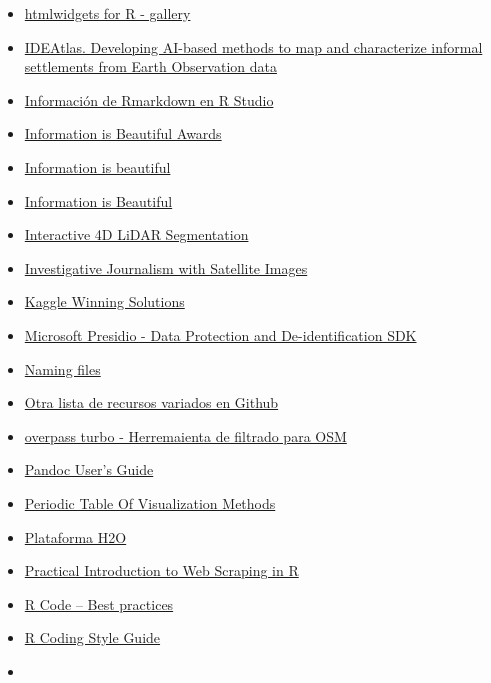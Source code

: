 \documentclass[
]{article}
\begin{document}
\begin{itemize}
\item
  \href{http://gallery.htmlwidgets.org/}{htmlwidgets for R - gallery}
\item
  \href{https://ideatlas.eu/}{IDEAtlas. Developing AI-based methods to
  map and characterize informal settlements from Earth Observation data}
\item
  \href{http://rmarkdown.rstudio.com/}{Información de Rmarkdown en R
  Studio}
\item
  \href{https://www.informationisbeautifulawards.com/}{Information is
  Beautiful Awards}
\item
  \href{https://informationisbeautiful.net/}{Information is beautiful}
\item
  \href{informationisbeautiful.net/data}{Information is Beautiful}
\item
  \href{https://ilya-fradlin.github.io/Interactive4D/}{Interactive 4D
  LiDAR Segmentation}
\item
  \href{https://bourgoing.com/en/linvestigation-par-satellite/}{Investigative
  Journalism with Satellite Images}
\item
  \href{http://kagglesolutions.com/}{Kaggle Winning Solutions}
\item
  \href{https://microsoft.github.io/presidio/}{Microsoft Presidio - Data
  Protection and De-identification SDK}
\item
  \href{https://speakerd.s3.amazonaws.com/presentations/5e4b07f0d9a94f8e9a29b902bad6ed0b/naming-slides.pdf}{Naming
  files}
\item
  \href{https://github.com/Shujian2015/FreeML}{Otra lista de recursos
  variados en Github}
\item
  \href{https://overpass-turbo.eu/}{overpass turbo - Herremaienta de
  filtrado para OSM}
\item
  \href{http://pandoc.org/MANUAL.html\#templates}{Pandoc User's Guide}
\item
  \href{https://www.visual-literacy.org/periodic_table/periodic_table.html}{Periodic
  Table Of Visualization Methods}
\item
  \href{https://github.com/h2oai}{Plataforma H2O}
\item
  \href{https://blog.rsquaredacademy.com/web-scraping/}{Practical
  Introduction to Web Scraping in R}
\item
  \href{https://www.r-bloggers.com/r-code-best-practices/}{R Code --
  Best practices}
\item
  \href{https://irudnyts.github.io//r-coding-style-guide/}{R Coding
  Style Guide}
\item

\end{itemize}
\end{document}
